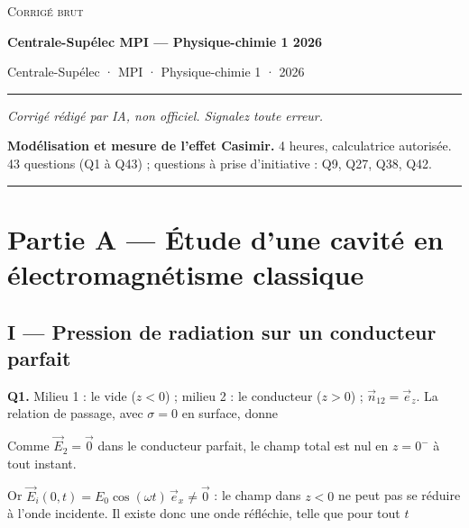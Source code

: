 \documentclass[11pt,a4paper]{article}
\newcommand{\equationajustee}[1]{%
  \sbox{\boiteequation}{$\displaystyle #1$}%
  \ifdim\wd\boiteequation>\linewidth
    \[\resizebox{\linewidth}{!}{\usebox{\boiteequation}}\]%
  \else
    \[#1\]%
  \fi}
\begin{document}
\thispagestyle{plain}
\begin{center}
  {\small\scshape Corrigé brut}\par\smallskip
  {\LARGE\bfseries Centrale-Supélec MPI — Physique-chimie 1 2026\par}\medskip
  {\large Centrale-Supélec · MPI · Physique-chimie 1 · 2026\par}
\end{center}
\vspace{2pt}\hrule\vspace{8pt}

\emph{Corrigé rédigé par IA, non officiel. Signalez toute erreur.}

\textbf{Modélisation et mesure de l'effet Casimir.} 4 heures, calculatrice autorisée. 43 questions (Q1 à Q43) ; questions à prise d'initiative : Q9, Q27, Q38, Q42.

\begin{center}\rule{0.5\linewidth}{0.5pt}\end{center}

\hypertarget{partie-a-uxe9tude-dune-cavituxe9-en-uxe9lectromagnuxe9tisme-classique}{%
\section{Partie A --- Étude d'une cavité en électromagnétisme classique}\label{partie-a-uxe9tude-dune-cavituxe9-en-uxe9lectromagnuxe9tisme-classique}}

\hypertarget{i-pression-de-radiation-sur-un-conducteur-parfait}{%
\subsection{I --- Pression de radiation sur un conducteur parfait}\label{i-pression-de-radiation-sur-un-conducteur-parfait}}

\textbf{Q1.} Milieu 1 : le vide (\(z<0\)) ; milieu 2 : le conducteur (\(z>0\)) ; \(\vec n_{12}=\vec e_z\). La relation de passage, avec \(\sigma=0\) en surface, donne

\equationajustee{\vec E_2-\vec E_1=\vec 0}

Comme \(\vec E_2=\vec 0\) dans le conducteur parfait, le champ total est nul en \(z=0^-\) à tout instant.

Or \(\vec E_i(0,t)=E_0\cos(\omega t)\,\vec e_x\neq\vec 0\) : le champ dans \(z<0\) ne peut pas se réduire à l'onde incidente. Il existe donc une onde réfléchie, telle que pour tout \(t\)

\equationajustee{\vec E_r(0,t)=-E_0\cos(\omega t)\,\vec e_x}
\end{document}
